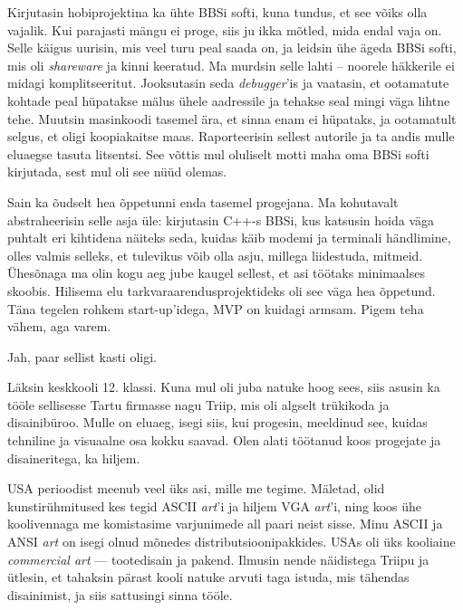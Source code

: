 Kirjutasin hobiprojektina ka ühte BBSi softi, kuna tundus, et see 
võiks olla vajalik. Kui parajasti mängu ei proge, siis ju ikka mõtled, mida endal vaja on. Selle käigus 
uurisin, mis veel turu peal saada on, ja leidsin ühe ägeda BBSi softi, mis oli \emph{shareware} ja kinni keeratud. Ma murdsin selle lahti -- 
noorele häkkerile ei midagi komplitseeritut. Jooksutasin seda 
\emph{debugger}'is ja vaatasin, et ootamatute kohtade peal hüpatakse mälus 
ühele aadressile ja tehakse seal mingi väga lihtne tehe. Muutsin masinkoodi 
tasemel ära, et sinna enam ei hüpataks, ja ootamatult selgus, et oligi 
koopiakaitse maas. Raporteerisin sellest autorile ja ta andis mulle eluaegse tasuta litsentsi. See võttis mul oluliselt 
motti maha oma BBSi softi kirjutada, sest mul oli see nüüd olemas. 

Sain ka õudselt hea õppetunni enda tasemel progejana. 
Ma kohutavalt abstraheerisin selle asja üle: kirjutasin C++-s 
BBSi, kus katsusin hoida väga puhtalt eri kihtidena näiteks seda, kuidas 
käib modemi ja terminali händlimine, olles valmis selleks,
et tulevikus võib olla asju, millega liidestuda, mitmeid. 
Ühesõnaga ma olin kogu aeg jube kaugel sellest, et asi töötaks 
minimaalses skoobis. Hilisema elu tarkvaraarendusprojektideks oli see väga hea 
õppetund. Täna tegelen rohkem start-up'idega, MVP on kuidagi 
armsam. Pigem teha vähem, aga varem.


Jah, paar sellist kasti oligi. 


Läksin keskkooli 12. klassi. Kuna mul oli juba natuke hoog sees, 
siis asusin ka tööle sellisesse Tartu firmasse nagu Triip, mis oli 
algselt trükikoda ja disainibüroo. Mulle on eluaeg, isegi siis, kui 
progesin, meeldinud see, kuidas tehniline ja visuaalne osa kokku saavad. 
Olen alati töötanud koos progejate 
ja disaineritega, ka hiljem.

USA perioodist meenub veel üks asi, mille me tegime. Mäletad, olid kunstirühmitused 
kes tegid ASCII \emph{art}'i ja hiljem VGA \emph{art}'i, ning koos ühe koolivennaga me komistasime
varjunimede all paari neist sisse. Minu ASCII ja ANSI \emph{art} on isegi olnud mõnedes distributsioonipakkides. USAs oli üks kooliaine \emph{commercial art} ---
tootedisain ja pakend. Ilmusin nende näidistega Triipu ja ütlesin, et 
tahaksin pärast kooli natuke arvuti taga istuda, mis tähendas 
disainimist, ja siis sattusingi sinna tööle.
 
